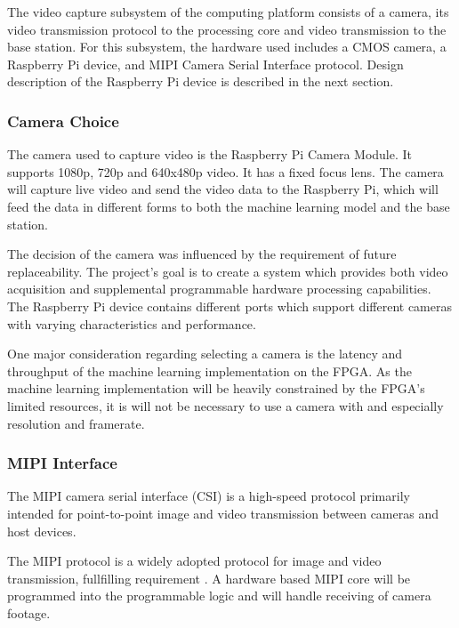 
The video capture subsystem of the computing platform consists of a camera, its video transmission protocol to the processing core and video transmission to the base station. For this subsystem, the hardware used includes a CMOS camera, a Raspberry Pi device, and MIPI Camera Serial Interface protocol. Design description of the Raspberry Pi device is described in the next section.

\subsubsection{Camera Choice}
The camera used to capture video is the Raspberry Pi Camera Module. It supports 1080p, 720p and 640x480p video. It has a fixed focus lens. The camera will capture live video and send the video data to the Raspberry Pi, which will feed the data in different forms to both the machine learning model and the base station.

The decision of the camera was influenced by the requirement of future replaceability. The project's goal is to create a system which provides both video acquisition and supplemental programmable hardware processing capabilities. The Raspberry Pi device contains different ports which support different cameras with varying characteristics and performance.

One major consideration regarding selecting a camera is the latency and throughput of the machine learning implementation on the FPGA. As the machine learning implementation will be heavily constrained by the FPGA's limited resources, it is will not be necessary to use a camera with and especially resolution and framerate.

\subsubsection{MIPI Interface}
The MIPI camera serial interface (CSI) is a high-speed protocol primarily intended for point-to-point image and video transmission between cameras and host devices. 

The MIPI protocol is a widely adopted protocol for image and video transmission, fullfilling requirement . A hardware based MIPI core will be programmed into the programmable logic and will handle receiving of camera footage.

